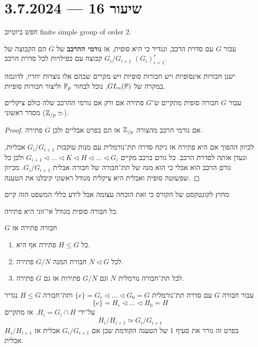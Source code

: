 \section{שיעור 16 --- 3.7.2024}
חפש ביוטיוב finite simple group of order 2.
\begin{definition}
	עבור $G$ עם סדרת הרכב, ונגדיר כי היא סופית,
	אז \textbf{גורמי ההרכב} של $G$ הם הקבוצה של $G_i / G_{i + 1}$ קבוצה עם כפילויות לכל סדרת הרכב ${(G_i)}_{i = 1}^r$.
\end{definition}
ישנן חבורות אינסופיות ויש חבורות סופיות ויש מקרים שבהם אלו נוצרות יחדיו, לדוגמה במקרה של $GL_n(\mathbb{F})$, נוכל לבחור $\mathbb{F}_p$ וליצור חבורות סופיות.
\begin{proposition}
	עבור $G$ חבורה סופית מתקיים ש־$G$ פתירה אם ורק אם גורמי ההרכב שלה כולם ציקליים מסדר ראשוני ($\mathbb{Z}_{/p} \simeq$).
\end{proposition}
\begin{proof}
	אם גורמי הרכב מהצורה $\mathbb{Z}_{/p}$ אז הם בפרט אבליים ולכן $G$ פתירה.

	לכיוון ההפוך אם היא פתירה אז ניקח סדרה תת־נורמלית עם מנות עוקבות $G_i / G_{i + 1}$ אבליות, ונעדן אותה לסדרת הרכב.
	כל גורם ברכב מקיים $G_{i + 1} \triangleleft \dots \triangleleft K \triangleleft H \triangleleft \dots \triangleleft G_i$ ולכן כל גורם הרכב הוא אבלי כי הוא מנה של תת־חבורה של חבורה אבלית $G_i / G_{i + 1}$.
	מכיוון שפשוטה סופית ואבלית היא ציקלית מגודל ראשוני קיבלנו את הטענה.
\end{proof}
מחוץ לקונטקסט של הקורס כי זאת הוכחה עצומה אבל לידע כללי המשפט הזה קיים
\begin{theorem}
	כל חבורה סופית מגודל אי־זוגי היא פתירה.
\end{theorem}
\begin{proposition}
	$G$ חבורה פתירה אז
	\begin{enumerate}
		\item כל $H \le G$ פתירה אף היא.
		\item לכל $N \triangleleft G$ חבורת המנה $G/N$ פתירה.
		\item לכל תת־חבורה נורמלית $N$ וגם $G/N$ פתירות אז גם $G$ פתירה.
	\end{enumerate}
\end{proposition}
\begin{lemma}
	עבור חבורה $G$ עם סדרה תת־נורמלית $\{e\} = G_r \triangleleft \dots \triangleleft G_0 = G$ ותת־חבורה $H \le G$ נגדיר
	\[
		\{e\} = H_r \triangleleft \dots \triangleleft H_0 = H
	\]
	על־ידי $H_i = G_i \cap H$. אז מתקיים
	\[
		H_i / H_{i + 1} \simeq G_i / G_{i + 1}
	\]
	בפרט זה גורר את סעיף 1 של הטענה הקודמת שכן אם $G_i / G_{i + 1}$ אבלית אז $H_i / H_{i + 1}$ אבלית.
\end{lemma}
